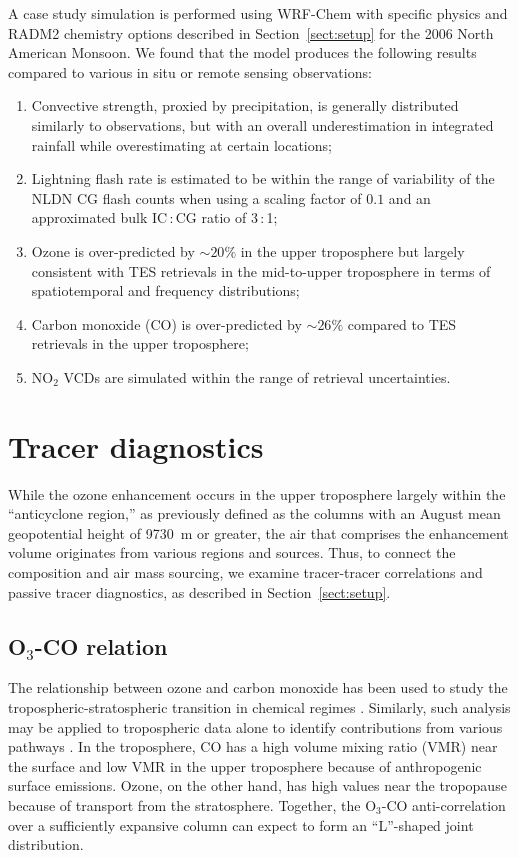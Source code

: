 A case study simulation is performed using WRF-Chem with specific physics and
RADM2 chemistry options described in Section~\ref{sect:setup} for the 2006 North American
Monsoon. We found that the model produces the following results compared to
various in situ or remote sensing observations:
\begin{enumerate}
\item Convective strength, proxied by precipitation, is generally distributed similarly to observations, but
with an overall underestimation in integrated rainfall while overestimating at certain locations;
\item Lightning flash rate is estimated to be within the range of variability of the NLDN CG flash counts when using
a scaling factor of $0.1$ and an approximated bulk IC\,:\,CG ratio of 3\,:\,1;
\item Ozone is over-predicted by $\sim20\%$ in the upper troposphere but largely consistent
with TES retrievals in the mid-to-upper troposphere in terms of spatiotemporal and frequency distributions;
\item Carbon monoxide (CO) is over-predicted by $\sim26\%$ compared to TES retrievals in the upper troposphere;
\item NO$_2$ VCDs are simulated within the range of retrieval uncertainties.
\end{enumerate}

\section{Tracer diagnostics}\label{sect:diag}

While the ozone enhancement occurs in the upper troposphere largely within the ``anticyclone
region,'' as previously defined as the columns with an August mean geopotential height of 9730~m
or greater, the air that comprises the enhancement volume originates from various regions and
sources. Thus, to connect the composition and air mass sourcing, we examine tracer-tracer
correlations and passive tracer diagnostics, as described in Section~\ref{sect:setup}.

\subsection{O$_3$-CO relation}\label{sect:diag/tracer}

The relationship between ozone and carbon monoxide has been
used to study the tropospheric-stratospheric transition in chemical regimes
\citep[e.g.][and references therein]{Pan:2007sw,Hegglin:2009fk}. Similarly,
such analysis may be applied to tropospheric data alone to identify contributions
from various pathways \citep[e.g.][]{Zhang:2006zr,Voulgarakis:2011fk,Cristofanelli:2013uq}.
In the troposphere, CO has a high volume mixing ratio (VMR) near the surface and low VMR in the upper
troposphere because of anthropogenic surface emissions. Ozone, on the other hand,
has high values near the tropopause because of transport from the stratosphere.
Together, the {O$_3$-CO} anti-correlation over a sufficiently expansive column
can expect to form an ``L''-shaped joint distribution.

